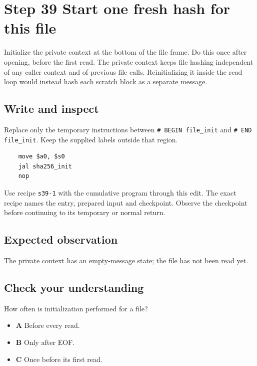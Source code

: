 \section{Step 39 Start one fresh hash for this file}\label{sha-s39}

Initialize the private context at the bottom of the file frame. Do this once after opening, before the first read. The private context keeps file hashing independent of any caller context and of previous file calls. Reinitializing it inside the read loop would instead hash each scratch block as a separate message.

\subsection{Write and inspect}
Replace only the temporary instructions between \texttt{\# BEGIN file\_init} and \texttt{\# END file\_init}. Keep the supplied labels outside that region.

\begin{verbatim}
    move $a0, $s0
    jal sha256_init
    nop
\end{verbatim}

Use recipe \texttt{s39-1} with the cumulative program through this edit. The exact recipe names the entry, prepared input and checkpoint. Observe the checkpoint before continuing to its temporary or normal return.

\subsection{Expected observation}
The private context has an empty-message state; the file has not been read yet.

\subsection{Check your understanding}
How often is initialization performed for a file?

\begin{itemize}
\item \textbf{A} Before every read.
\item \textbf{B} Only after EOF.
\item \textbf{C} Once before its first read.
\end{itemize}
